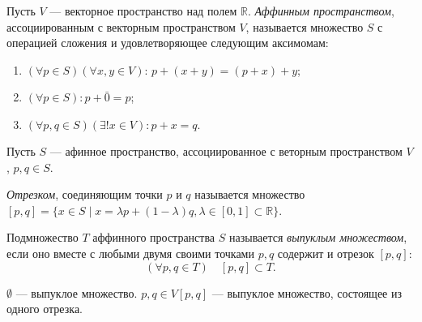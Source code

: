 
\begin{definition}
	Пусть $V$ --- векторное пространство над полем $\mathbb{R}$. \textit{Аффинным пространством}, ассоциированным с векторным пространством $V$, называется множество $S$ с операцией сложения и удовлетворяющее следующим аксимомам:
	\begin{enumerate}[label={(\arabic*)}]
		\item $(\forall p \in S) (\forall x, y \in V): \, p + (x + y) = (p + x) + y$;
		
		\item $(\forall p \in S): p + \bar{0} = p$;
		
		\item $(\forall p, q \in S) (\exists! x \in V): p + x = q.$
	\end{enumerate}
\end{definition}


\begin{definition}
	Пусть $S$ --- афинное пространство, ассоциированное с веторным пространством $V$, $p, q \in S$.
	
	\textit{Отрезком}, соединяющим точки $p$ и $q$ называется множество $[p, q] = \{x \in S \mid x = \lambda p + (1 - \lambda) q, \lambda \in [0, 1] \subset \mathbb{R}\}$.
\end{definition}

\begin{definition}\label{выпуклое множество}
	Подмножество $T$ аффинного пространства $S$ называется \textit{выпуклым множеством}, если оно вместе с любыми двумя своими точками $p, q$ содержит и отрезок $[p, q]$:
	\begin{equation*}
		(\forall p, q \in T) \quad [p, q] \subset T.
	\end{equation*}
	
	\begin{figure}[H]
		\centering 
		
	\end{figure}
	
	$\emptyset$ --- выпуклое множество.
	$p, q \in V [p, q]$ --- выпуклое множество, состоящее из одного отрезка.
\end{definition}

